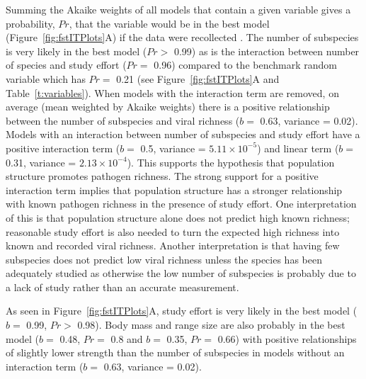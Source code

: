 Summing the Akaike weights of all models that contain a given variable gives a probability, $Pr$, that the variable would be in the best model (Figure~\ref{fig:fstITPlots}A) if the data were recollected \cite{whittingham2006we}.
The number of subspecies is very likely in the best model ($Pr > $ 0.99) as is the interaction between number of species and study effort ($Pr = $ 0.96) compared to the benchmark random variable which has $Pr = $ 0.21 (see Figure~\ref{fig:fstITPlots}A and Table~\ref{t:variables}).
When models with the interaction term are removed, on average (mean weighted by Akaike weights) there is a positive relationship between the number of subspecies and viral richness ($b = $ 0.63, variance = 0.02).
Models with an interaction between number of subspecies and study effort have a positive interaction term ($b = $ 0.5, variance = \ensuremath{5.11\times 10^{-5}}) and linear term ($b = $ 0.31, variance = \ensuremath{2.13\times 10^{-4}}).
This supports the hypothesis that population structure promotes pathogen richness.
The strong support for a positive interaction term implies that population structure has a stronger relationship with known pathogen richness in the presence of study effort.
One interpretation of this is that population structure alone does not predict high known richness; reasonable study effort is also needed to turn the expected high richness into known and recorded viral richness.
Another interpretation is that having few subspecies does not predict low viral richness unless the species has been adequately studied as otherwise the low number of subspecies is probably due to a lack of study rather than an accurate measurement.


As seen in Figure~\ref{fig:fstITPlots}A, study effort is very likely in the best model ($b = $ 0.99, $Pr > $ 0.98).
Body mass and range size are also probably in the best model ($b = $ 0.48, $Pr = $ 0.8 and $b = $ 0.35, $Pr = $ 0.66) with positive relationships of slightly lower strength than the number of subspecies in models without an interaction term ($b = $ 0.63, variance = 0.02).	



